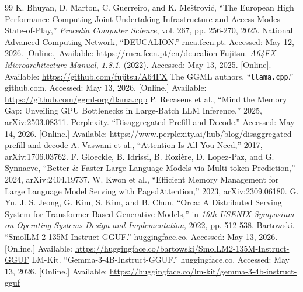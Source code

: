 \documentclass[11pt, a4paper]{article}
\begin{document}
\begin{thebibliography}{99}
    \small
        K. Bhuyan, D. Marton, C. Guerreiro, and K. Meštrović,
        ``The European High Performance Computing Joint Undertaking Infrastructure and Access Modes State-of-Play,''
        \emph{Procedia Computer Science}, vol. 267, pp. 256-270, 2025.
        National Advanced Computing Network,
        ``DEUCALION.''
        rnca.fccn.pt.
        Accessed: May 12, 2026. [Online.] Available:
        \url{https://rnca.fccn.pt/en/deucalion}
        Fujitsu.
        \emph{A64FX Microarchitecture Manual}, \emph{1.8.1}.
        (2022).
        Accessed: May 13, 2025. [Online]. Available:
        \url{https://github.com/fujitsu/A64FX}
        The GGML authors.
        ``\texttt{llama.cpp}.''
        github.com.
        Accessed: May 13, 2026. [Online.] Available:
        \url{https://github.com/ggml-org/llama.cpp}
        P. Recasens et al.,
        ``Mind the Memory Gap: Unveiling GPU Bottlenecks in Large-Batch LLM Inference,''
        2025, arXiv:2503.08311.
        Perplexity.
        ``Disaggregated Prefill and Decode.''
        Accessed: May 14, 2026. [Online.] Available:
        \url{https://www.perplexity.ai/hub/blog/disaggregated-prefill-and-decode}
        A. Vaswani et al.,
        ``Attention Is All You Need,''
        2017, arXiv:1706.03762.
        F. Gloeckle, B. Idrissi, B. Rozière, D. Lopez-Paz, and G. Synnaeve,
        ``Better \& Faster Large Language Models via Multi-token Prediction,''
        2024, arXiv:2404.19737.
        W. Kwon et al.,
        ``Efficient Memory Management for Large Language Model Serving with PagedAttention,''
        2023, arXiv:2309.06180.
        G. Yu, J. S. Jeong, G. Kim, S. Kim, and B. Chun,
        ``Orca: A Distributed Serving System for Transformer-Based Generative Models,''
        in \emph{16th USENIX Symposium on Operating Systems Design and Implementation},
        2022, pp. 512-538.
        Bartowski.
        ``SmolLM-2-135M-Instruct-GGUF.''
        huggingface.co.
        Accessed: May 13, 2026. [Online.] Available:
        \url{https://huggingface.co/bartowski/SmolLM2-135M-Instruct-GGUF}
        LM-Kit.
        ``Gemma-3-4B-Instruct-GGUF.''
        huggingface.co.
        Accessed: May 13, 2026. [Online.] Available:
        \url{https://huggingface.co/lm-kit/gemma-3-4b-instruct-gguf}

\end{thebibliography}
\end{document}
